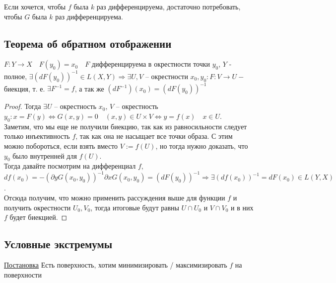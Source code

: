 \follow Если хочется, чтобы $f$ была $k$ раз дифференцируема, достаточно потребовать, чтобы $G$ была $k$ раз дифференцируема.

\subsection{Теорема об обратном отображении}
\begin{theorem}
    $F \colon Y \to X \quad F(y_0) = x_0 \quad F$ дифференцируема в окрестности точки $y_0$, $Y$ - полное, $\exists (d F(y_0))^{-1} \in L(X, Y) \Rightarrow \exists U, V$ -- окрестности $x_0, y_0 \colon F \colon V \to U -$ биекция, т. е. $\exists F^{-1} = f$, а так же $(dF^{-1})(x_0) = (d F(y_0))^{-1}$
\end{theorem}
\begin{proof}
    Тогда $\exists U$ -- окрестность $x_0$, $V$ -- окрестность $y_0 \colon x = F(y) \Leftrightarrow G(x, y) = 0 \quad (x, y) \in U \times V \Leftrightarrow y = f(x) \quad x \in U$.\\
    Заметим, что мы еще не получили биекцию, так как из равносильности следует только инъективность $f$, так как она не насыщает все точки образа. С этим можно побороться, если взять вместо $V := f(U)$, но тогда нужно доказать, что $y_0$ было внутренней для $f(U)$.\\
    Тогда давайте посмотрим на дифференциал $f$, $df(x_0) = -(\partial y G(x_0, y_0))^{-1} \partial x G(x_0, y_0) = (d F(y_0))^{-1} \Rightarrow \exists (d f(x_0))^{-1} = d F(x_0) \in L(Y, X)$.\\
    Отсюда получим, что можно применить рассуждения выше для функции $f$ и получить окрестности $U_0, V_0$, тогда итоговые будут равны $U \cap U_0$ и $V \cap V_0$ и в них $f$ будет биекцией.
\end{proof}

\subsection{Условные экстремумы}

\underline{Постановка} Есть поверхность, хотим минимизировать / максимизировать $f$ на поверхности


